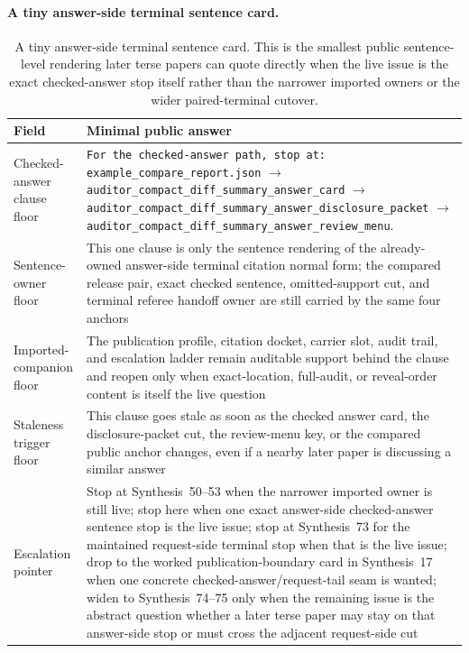 \documentclass[11pt]{article}
\begin{document}
\paragraph{A tiny answer-side terminal sentence card.}
\begin{table}[t]
\centering
\small
\begin{tabularx}{\linewidth}{@{}lX@{}}
\toprule
Field & Minimal public answer \\
\midrule
Checked-answer clause floor & \texttt{For the checked-answer path, stop at:}\newline
\texttt{\nolinkurl{example_compare_report.json}}\newline
$\to$\newline
\texttt{\nolinkurl{auditor_compact_diff_summary_answer_card}}\newline
$\to$\newline
\texttt{\nolinkurl{auditor_compact_diff_summary_answer_disclosure_packet}}\newline
$\to$\newline
\texttt{\nolinkurl{auditor_compact_diff_summary_answer_review_menu}}. \\
Sentence-owner floor & This one clause is only the sentence rendering of the already-owned answer-side terminal citation normal form; the compared release pair, exact checked sentence, omitted-support cut, and terminal referee handoff owner are still carried by the same four anchors \\
Imported-companion floor & The publication profile, citation docket, carrier slot, audit trail, and escalation ladder remain auditable support behind the clause and reopen only when exact-location, full-audit, or reveal-order content is itself the live question \\
Staleness trigger floor & This clause goes stale as soon as the checked answer card, the disclosure-packet cut, the review-menu key, or the compared public anchor changes, even if a nearby later paper is discussing a similar answer \\
Escalation pointer & Stop at Synthesis~50--53 when the narrower imported owner is still live; stop here when one exact answer-side checked-answer sentence stop is the live issue; stop at Synthesis~73 for the maintained request-side terminal stop when that is the live issue; drop to the worked publication-boundary card in Synthesis~17 when one concrete checked-answer/request-tail seam is wanted; widen to Synthesis~74--75 only when the remaining issue is the abstract question whether a later terse paper may stay on that answer-side stop or must cross the adjacent request-side cut \\
\bottomrule
\end{tabularx}
\caption{A tiny answer-side terminal sentence card. This is the smallest public sentence-level rendering later terse papers can quote directly when the live issue is the exact checked-answer stop itself rather than the narrower imported owners or the wider paired-terminal cutover.}
\label{tab:tiny-answer-side-terminal-sentence-card}
\end{table}
\end{document}
